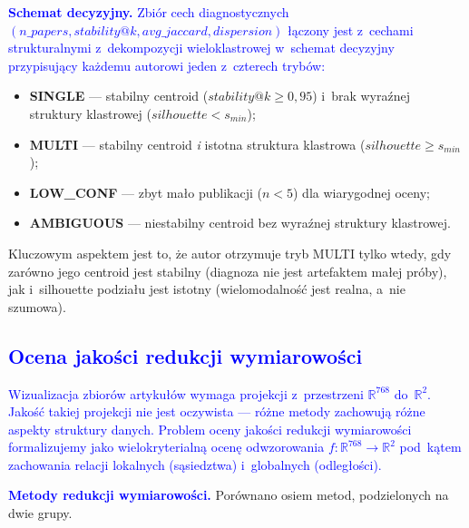 \documentclass[a4paper,11pt,twocolumn]{article}
\newcommand{\hl}[1]{\textcolor{blue}{#1}}
\begin{document}
\hl{\textbf{Schemat decyzyjny.}}
\label{sec:adaptive}
\hl{Zbiór cech diagnostycznych
$(n\_papers, stability@k, avg\_jaccard, dispersion)$ łączony jest
z~cechami strukturalnymi z~dekompozycji wieloklastrowej w~schemat
decyzyjny przypisujący każdemu autorowi jeden z~czterech trybów:}
\begin{itemize}
  \item \textbf{SINGLE} --- stabilny centroid ($stability@k \geq 0{,}95$)
        i~brak wyraźnej struktury klastrowej ($silhouette < s_{min}$);
  \item \textbf{MULTI} --- stabilny centroid \emph{i} istotna struktura
        klastrowa ($silhouette \geq s_{min}$);
  \item \textbf{LOW\_CONF} --- zbyt mało publikacji ($n < 5$) dla
        wiarygodnej oceny;
  \item \textbf{AMBIGUOUS} --- niestabilny centroid bez wyraźnej struktury
        klastrowej.
\end{itemize}

Kluczowym aspektem jest to, że autor otrzymuje tryb MULTI tylko wtedy,
gdy zarówno jego centroid jest stabilny (diagnoza nie jest artefaktem
małej próby), jak i~silhouette podziału jest istotny (wielomodalność
jest realna, a~nie szumowa).


\subsection{\hl{Ocena jakości redukcji wymiarowości}}
\label{sec:dr_method}

\hl{Wizualizacja zbiorów artykułów wymaga projekcji z~przestrzeni
$\mathbb{R}^{768}$ do~$\mathbb{R}^2$. Jakość takiej projekcji nie
jest oczywista --- różne metody zachowują różne aspekty struktury
danych. Problem oceny jakości redukcji wymiarowości formalizujemy
jako wielokryterialną ocenę odwzorowania
$f: \mathbb{R}^{768} \to \mathbb{R}^2$ pod~kątem zachowania
relacji lokalnych (sąsiedztwa) i~globalnych (odległości).}

\hl{\textbf{Metody redukcji wymiarowości.}}
Porównano osiem metod, podzielonych na dwie grupy.
\end{document}

